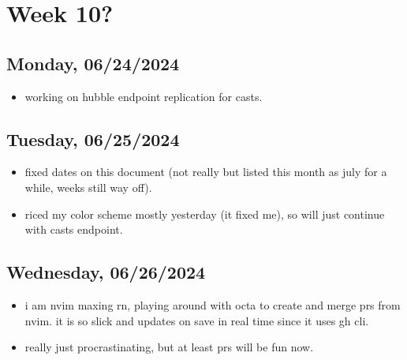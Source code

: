 \newpage
\section{Week 10?}
\subsection*{Monday, 06/24/2024}
\begin{itemize}
    \item working on hubble endpoint replication for casts. 
\end{itemize}

\subsection*{Tuesday, 06/25/2024}
\begin{itemize}
    \item fixed dates on this document (not really but listed this month as july
        for a while, weeks still way off).
    \item riced my color scheme mostly yesterday (it fixed me), so will just
        continue with casts endpoint. 
\end{itemize}

\subsection*{Wednesday, 06/26/2024}
\begin{itemize}
    \item i am nvim maxing rn, playing around with octa to create and merge prs
        from nvim. it is so slick and updates on save in real time since it uses
        gh cli. 
    \item really just procrastinating, but at least prs will be fun now. 
\end{itemize}
